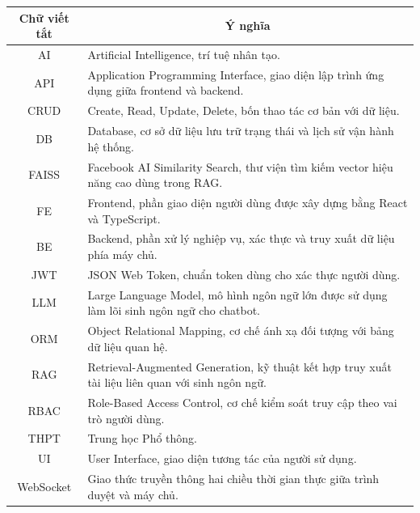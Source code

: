 \documentclass[12pt,a4paper]{article}
\begin{document}
	\begin{table}[H]
		\centering
		\begin{tabular}{|c|p{11cm}|}
			\hline
			{Chữ viết tắt} & \multicolumn{1}{c|}{\textbf{Ý nghĩa}} \\
			\hline
			AI & Artificial Intelligence, trí tuệ nhân tạo. \\
			\hline
			API & Application Programming Interface, giao diện lập trình ứng dụng giữa frontend và backend. \\
			\hline
			CRUD & Create, Read, Update, Delete, bốn thao tác cơ bản với dữ liệu. \\
			\hline
			DB & Database, cơ sở dữ liệu lưu trữ trạng thái và lịch sử vận hành hệ thống. \\
			\hline
			FAISS & Facebook AI Similarity Search, thư viện tìm kiếm vector hiệu năng cao dùng trong RAG. \\
			\hline
			FE & Frontend, phần giao diện người dùng được xây dựng bằng React và TypeScript. \\
			\hline
			BE & Backend, phần xử lý nghiệp vụ, xác thực và truy xuất dữ liệu phía máy chủ. \\
			\hline
			JWT & JSON Web Token, chuẩn token dùng cho xác thực người dùng. \\
			\hline
			LLM & Large Language Model, mô hình ngôn ngữ lớn được sử dụng làm lõi sinh ngôn ngữ cho chatbot. \\
			\hline
			ORM & Object Relational Mapping, cơ chế ánh xạ đối tượng với bảng dữ liệu quan hệ. \\
			\hline
			RAG & Retrieval-Augmented Generation, kỹ thuật kết hợp truy xuất tài liệu liên quan với sinh ngôn ngữ. \\
			\hline
			RBAC & Role-Based Access Control, cơ chế kiểm soát truy cập theo vai trò người dùng. \\
			\hline
			THPT & Trung học Phổ thông. \\
			\hline
			UI & User Interface, giao diện tương tác của người sử dụng. \\
			\hline
			WebSocket & Giao thức truyền thông hai chiều thời gian thực giữa trình duyệt và máy chủ. \\
			\hline
		\end{tabular}
	\end{table}
	
	\clearpage
	\pagestyle{fancy}
	\fancyhf{}
	\fancyhead[R]{\thepage}
	\renewcommand{\headrulewidth}{0.4pt}
	
\end{document}
